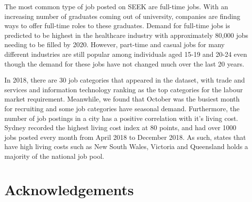 \documentclass[11pt,a4paper,]{article}
\begin{document}
The most common type of job posted on SEEK are full-time jobs. With an increasing number of graduates coming out of university, companies are finding ways to offer full-time roles to these graduates. Demand for full-time jobs is predicted to be highest in the healthcare industry with approximately 80,000 jobs needing to be filled by 2020. However, part-time and casual jobs for many different industries are still popular among individuals aged 15-19 and 20-24 even though the demand for these jobs have not changed much over the last 20 years.

In 2018, there are 30 job categories that appeared in the dataset, with trade and services and information technology ranking as the top categories for the labour market requirement. Meanwhile, we found that October was the busiest month for recruiting and some job categories have seasonal demand. Furthermore, the number of job postings in a city has a positive correlation with it's living cost. Sydney recorded the highest living cost index at 80 points, and had over 1000 jobs posted every month from April 2018 to December 2018. As such, states that have high living costs such as New South Wales, Victoria and Queensland holds a majority of the national job pool.

\hypertarget{acknowledgements}{%
\section{Acknowledgements}\label{acknowledgements}}

\textcite{whitehead}

\textcite{davidlasswell}

\textcite{pwcreport}

\textcite{aigroup}

\textcite{unemployment}

\textcite{welcome}

\textcite{DePietro}

\textcite{norman}

\textcite{burgess_2018}

\textcite{Weinstein}

\textcite{simplemaps_2019}

\textcite{emswiler_2016}

\textcite{Rggplot2}

\textcite{Rtidyverse}

\textcite{Rlubridate}

\textcite{Rtidyr}

\textcite{Rglue}

\textcite{Rnaniar}

\textcite{Rpolite}

\textcite{Rvest}

\textcite{Rxml}

\textcite{Readr}

\textcite{Rkable}

\textcite{Rforcats}

\printbibliography[title=References]
\end{document}
